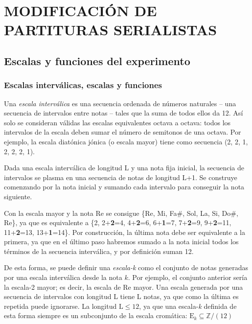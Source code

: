 	\chapter{MODIFICACIÓN DE PARTITURAS SERIALISTAS}
		
	\section{Escalas y funciones del experimento}
	\subsection{Escalas interválicas, escalas y funciones}
	
		Una \textit{escala interválica} es una secuencia ordenada de números naturales -- una secuencia de intervalos entre notas -- tales que la suma de todos ellos da 12. Así solo se consideran válidas las escalas equivalentes octava a octava: todos los intervalos de la escala deben sumar el número de semitonos de una octava. Por ejemplo, la escala diatónica jónica (o escala mayor) tiene como secuencia (2, 2, 1, 2, 2, 2, 1).
		
		Dada una escala interválica de longitud L y una nota fija inicial, la secuencia de intervalos se plasma en una secuencia de notas de longitud L+1. Se construye comenzando por la nota inicial y sumando cada intervalo para conseguir la nota siguiente. 
		
		Con la escala mayor y la nota Re se consigue \{Re, Mi, Fa$\#$, Sol, La, Si, Do$\#$, Re\}, ya que es equivalente a \{2, 2+\textbf{2}=4, 4+\textbf{2}=6, 6+\textbf{1}=7, 7+\textbf{2}=9, 9+\textbf{2}=11, 11+\textbf{2}=13, 13+\textbf{1}=14\}. Por construcción, la última nota debe ser equivalente a la primera, ya que en el último paso habremos sumado a la nota inicial todos los términos de la secuencia interválica, y por definición suman 12.
		
		De esta forma, se puede definir una \textit{escala-k} como el conjunto de notas generadas por una escala interválica desde la nota $k$. Por ejemplo, el conjunto anterior sería la escala-2 mayor; es decir, la escala de Re mayor. Una escala generada por una secuencia de intervalos con longitud L tiene L notas, ya que como la última es repetida puede ignorarse. La longitud $\text{L}\leq 12$, ya que una escala-\textit{k} definida de esta forma siempre es un subconjunto de la escala cromática: $\text{E}_k\subseteq\mathbb{Z}/(12)$
		
